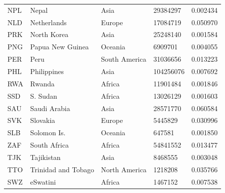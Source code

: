 \documentclass[11pt]{report}
\begin{document}
\begin{table}[h!]
\begin{tabular}{lllll}
            NPL                           & Nepal                     & Asia                           & 29384297                      & 0.002434                           \\
            NLD                           & Netherlands               & Europe                         & 17084719                      & 0.050970                           \\
            PRK                           & North Korea               & Asia                           & 25248140                      & 0.001584                           \\
            PNG                           & Papua New Guinea          & Oceania                        & 6909701                       & 0.004055                           \\
            PER                           & Peru                      & South America                  & 31036656                      & 0.013223                           \\
            PHL                           & Philippines               & Asia                           & 104256076                     & 0.007692                           \\
            RWA                           & Rwanda                    & Africa                         & 11901484                      & 0.001846                           \\
            SSD                           & S. Sudan                  & Africa                         & 13026129                      & 0.001603                           \\
            SAU                           & Saudi Arabia              & Asia                           & 28571770                      & 0.060584                           \\
            SVK                           & Slovakia                  & Europe                         & 5445829                       & 0.030996                           \\
            SLB                           & Solomon Is.               & Oceania                        & 647581                        & 0.001850                           \\
            ZAF                           & South Africa              & Africa                         & 54841552                      & 0.013477                           \\
            TJK                           & Tajikistan                & Asia                           & 8468555                       & 0.003048                           \\
            TTO                           & Trinidad and Tobago       & North America                  & 1218208                       & 0.035766                           \\
            SWZ                           & eSwatini                  & Africa                         & 1467152                       & 0.007538
        \end{tabular}
    \end{table}
\end{document}
